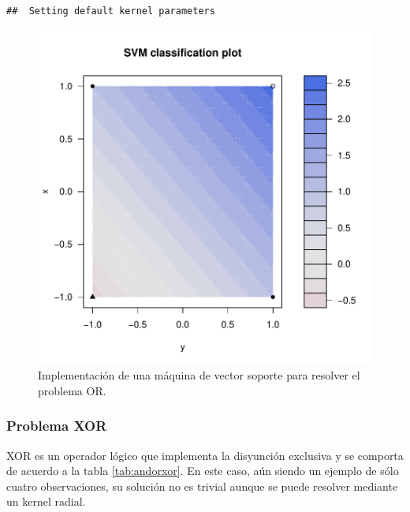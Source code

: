 \documentclass[12pt,spanish,a4paper]{article}
\newenvironment{Shaded}{\begin{snugshade}}{\end{snugshade}}
\newcommand{\CommentTok}[1]{\textcolor[rgb]{0.56,0.35,0.01}{\textit{#1}}}
\newcommand{\DataTypeTok}[1]{\textcolor[rgb]{0.13,0.29,0.53}{#1}}
\newcommand{\FloatTok}[1]{\textcolor[rgb]{0.00,0.00,0.81}{#1}}
\newcommand{\KeywordTok}[1]{\textcolor[rgb]{0.13,0.29,0.53}{\textbf{#1}}}
\newcommand{\NormalTok}[1]{#1}
\newcommand{\OperatorTok}[1]{\textcolor[rgb]{0.81,0.36,0.00}{\textbf{#1}}}
\numberwithin{equation}{section}
\begin{document}
\begin{verbatim}
##  Setting default kernel parameters
\end{verbatim}

\begin{Shaded}
\end{Shaded}

\begin{figure}[h]

{\centering \includegraphics[width=0.65\linewidth]{graphics/svm/or-1} 

}

\caption{Implementación de una máquina de vector soporte para resolver el problema OR.}\label{fig:or}
\end{figure}

\hypertarget{problema-xor}{%
\subsubsection{Problema XOR}\label{problema-xor}}

XOR es un operador lógico que implementa la disyunción exclusiva y se
comporta de acuerdo a la tabla \ref{tab:andorxor}. En este caso, aún
siendo un ejemplo de sólo cuatro observaciones, su solución no es
trivial aunque se puede resolver mediante un kernel radial.
\end{document}
